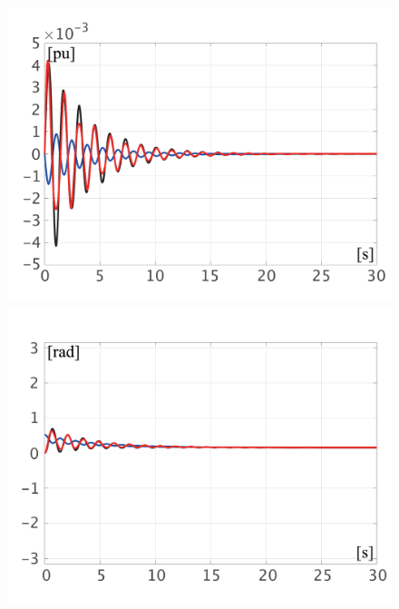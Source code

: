\documentclass[tombow,dvipdfmx]{corona-a5-1.1}
\begin{document}
\begin{figure}[t]
  \centering
  {
  \begin{minipage}{0.49\linewidth}
    \centering
    \includegraphics[width = 1.0\linewidth]{figs/Domegalin}
    \medskip
  \end{minipage}
  \begin{minipage}{0.49\linewidth}
    \centering
    \includegraphics[width = 1.0\linewidth]{figs/deltalin}
    \medskip
  \end{minipage}
 \begin{minipage}{0.49\linewidth}
    \centering

\end{minipage}}
\end{figure}
\end{document}
